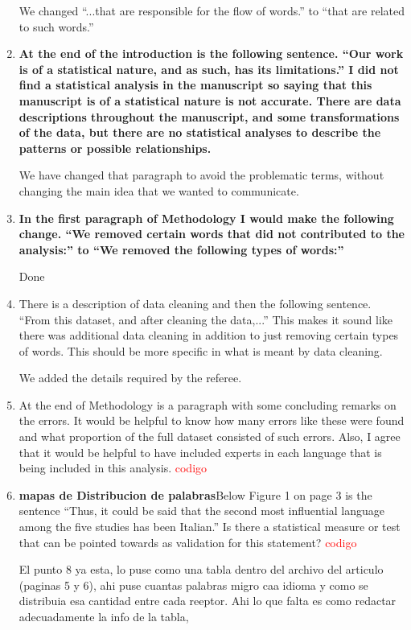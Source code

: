 \documentclass{article}
\begin{document}
\begin{enumerate}
We changed ``...that are responsible for the flow of words.'' to 
``that are related to such words.''

\item \textbf{At the end of the introduction is the following sentence. “Our work
is of a statistical nature, and as such, has its limitations.” I did
not find a statistical analysis in the manuscript so saying that this
manuscript is of a statistical nature is not accurate. There are data
descriptions throughout the manuscript, and some transformations of
the data, but there are no statistical analyses to describe the
patterns or possible relationships.}

We have changed that paragraph to avoid the problematic terms, without changing the main
idea that we wanted to communicate. 
\item \textbf{In the first paragraph of Methodology I would make the following
change. “We removed certain words that did not contributed to the
analysis:” to “We removed the following types of words:”}

Done

\item  There is a description of data cleaning and then the following
sentence. ``From this dataset, and after cleaning the data,...'' This
makes it sound like there was additional data cleaning in addition to
just removing certain types of words. This should be more specific in
what is meant by data cleaning.

We added the details required by the referee.
\item At the end of Methodology is a paragraph with some concluding %
remarks on the errors. It would be helpful to know how many errors
like these were found and what proportion of the full dataset
consisted of such errors. Also, I agree that it would be helpful to
have included experts in each language that is being included in this
analysis. \textcolor{red}{codigo}
\item \textbf{mapas de Distribucion de palabras}Below Figure 1 on page 3 is the sentence “Thus, it could be said 
that the second most influential language among the five studies has
been Italian.” Is there a statistical measure or test that can be
pointed towards as validation for this statement? \textcolor{red}{codigo}

El punto 8 ya esta, lo puse como una tabla dentro del archivo del articulo (paginas 5 y 6), ahi puse cuantas palabras migro caa idioma y como se distribuia esa cantidad entre cada reeptor. Ahi lo que falta es como redactar adecuadamente la info de la tabla,


\end{enumerate}
\end{document}
